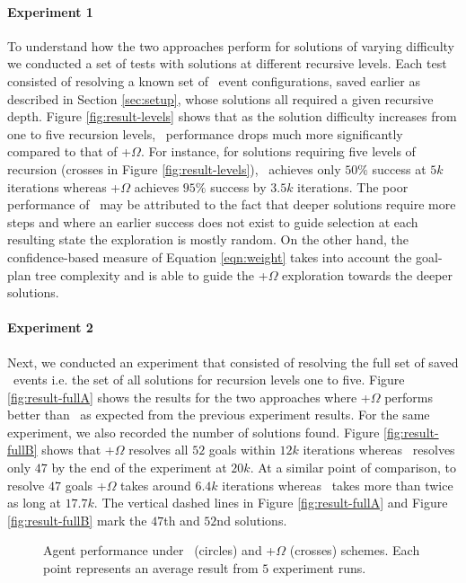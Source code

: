 \paragraph{Experiment 1} To understand how the two approaches perform for solutions of varying difficulty we conducted a set of tests with solutions at different recursive levels. Each test consisted of resolving a known set of \eSolve\  event configurations, saved earlier as described in Section \ref{sec:setup}, whose solutions all required a given recursive depth. Figure \ref{fig:result-levels} shows that as the solution difficulty increases from one to five recursion levels, \CL\ performance drops much more significantly compared to that of \CL+$\Omega$. For instance, for solutions requiring five levels of recursion (crosses in Figure \ref{fig:result-levels}), \CL\ achieves only $50\%$ success at $5k$ iterations whereas \CL+$\Omega$ achieves $95\%$ success by $3.5k$ iterations. The poor performance of \CL\ may be attributed to the fact that deeper solutions require more  steps and where an earlier success does not exist to guide selection at each resulting state the exploration is mostly random. On the other hand, the confidence-based measure of Equation \ref{eqn:weight} takes into account the goal-plan tree complexity and is able to guide the \CL+$\Omega$ exploration towards the deeper solutions.

\paragraph{Experiment 2} Next, we conducted an experiment that consisted of resolving the full set of saved \eSolve\  events i.e. the set of all solutions for recursion levels one to five. Figure \ref{fig:result-fullA} shows the results for the two approaches where \CL+$\Omega$ performs better than \CL\ as expected from the previous experiment results. For the same experiment, we also recorded the number of solutions found. Figure \ref{fig:result-fullB} shows that \CL+$\Omega$ resolves all $52$ goals within $12k$ iterations whereas \CL\ resolves only $47$ by the end of the experiment at $20k$. At a similar point of comparison, to resolve $47$ goals \CL+$\Omega$ takes around $6.4k$ iterations whereas \CL\ takes more than twice as long at $17.7k$. The vertical dashed lines in Figure \ref{fig:result-fullA} and Figure \ref{fig:result-fullB} mark the $47$th and $52$nd solutions.

\begin{figure*}[t]
\begin{center}
\qquad
{}
\caption{Agent performance under \CL\ (circles) and \CL+$\Omega$ (crosses) schemes. Each point represents an average result from $5$ experiment runs.}
\label{fig:result-full}
\end{center}
\end{figure*}


